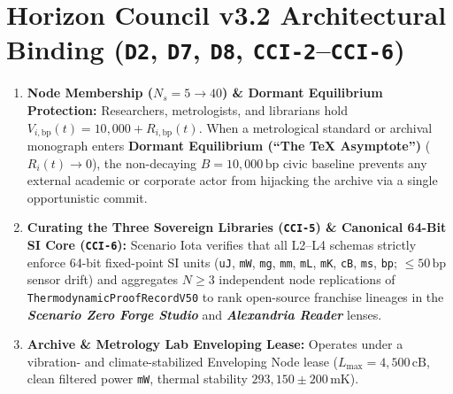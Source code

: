 \section{Horizon Council v3.2 Architectural Binding (\texttt{D2}, \texttt{D7}, \texttt{D8}, \texttt{CCI-2}--\texttt{CCI-6})}
\begin{enumerate}
    \item \textbf{Node Membership ($N_s = 5 \to 40$) \& Dormant Equilibrium Protection:} Researchers, metrologists, and librarians hold $V_{i,\mathrm{bp}}(t) = 10{,}000 + R_{i,\mathrm{bp}}(t)$. When a metrological standard or archival monograph enters \textbf{Dormant Equilibrium (``The \TeX{} Asymptote'')} ($R_i(t) \to 0$), the non-decaying $B = 10{,}000\,\mathrm{bp}$ civic baseline prevents any external academic or corporate actor from hijacking the archive via a single opportunistic commit.
    \item \textbf{Curating the Three Sovereign Libraries (\texttt{CCI-5}) \& Canonical 64-Bit SI Core (\texttt{CCI-6}):} Scenario Iota verifies that all L2--L4 schemas strictly enforce 64-bit fixed-point SI units (\texttt{uJ}, \texttt{mW}, \texttt{mg}, \texttt{mm}, \texttt{mL}, \texttt{mK}, \texttt{cB}, \texttt{ms}, \texttt{bp}; $\le 50\,\mathrm{bp}$ sensor drift) and aggregates $N \ge 3$ independent node replications of \texttt{ThermodynamicProofRecordV50} to rank open-source franchise lineages in the \textbf{\textit{Scenario Zero Forge Studio}} and \textbf{\textit{Alexandria Reader}} lenses.
    \item \textbf{Archive \& Metrology Lab Enveloping Lease:} Operates under a vibration- and climate-stabilized Enveloping Node lease ($L_{\max} = 4{,}500\,\mathrm{cB}$, clean filtered power \texttt{mW}, thermal stability $293{,}150 \pm 200\,\mathrm{mK}$).
\end{enumerate}

